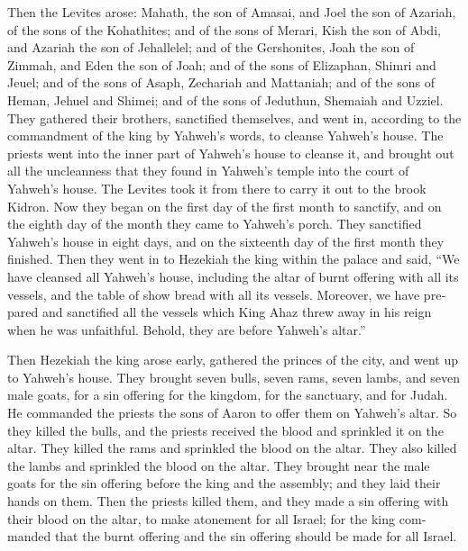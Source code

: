 \begin{paracol}{2}
\begin{otherlanguage}{english}
 Then the Levites arose: Mahath, the son of Amasai, and
Joel the son of Azariah, of the sons of the Kohathites; and of the sons
of Merari, Kish the son of Abdi, and Azariah the son of Jehallelel; and
of the Gershonites, Joah the son of Zimmah, and Eden the son of Joah;
 and of the sons of Elizaphan, Shimri and Jeuel; and of
the sons of Asaph, Zechariah and Mattaniah;  and of the
sons of Heman, Jehuel and Shimei; and of the sons of Jeduthun, Shemaiah
and Uzziel.  They gathered their brothers, sanctified
themselves, and went in, according to the commandment of the king by
Yahweh's words, to cleanse Yahweh's house.  The priests
went into the inner part of Yahweh's house to cleanse it, and brought
out all the uncleanness that they found in Yahweh's temple into the
court of Yahweh's house. The Levites took it from there to carry it out
to the brook Kidron.  Now they began on the first day of
the first month to sanctify, and on the eighth day of the month they
came to Yahweh's porch. They sanctified Yahweh's house in eight days,
and on the sixteenth day of the first month they finished.
 Then they went in to Hezekiah the king within the palace
and said, ``We have cleansed all Yahweh's house, including the altar of
burnt offering with all its vessels, and the table of show bread with
all its vessels.  Moreover, we have prepared and
sanctified all the vessels which King Ahaz threw away in his reign when
he was unfaithful. Behold, they are before Yahweh's altar.''

 Then Hezekiah the king arose early, gathered the princes
of the city, and went up to Yahweh's house.  They brought
seven bulls, seven rams, seven lambs, and seven male goats, for a sin
offering for the kingdom, for the sanctuary, and for Judah. He commanded
the priests the sons of Aaron to offer them on Yahweh's altar.
 So they killed the bulls, and the priests received the
blood and sprinkled it on the altar. They killed the rams and sprinkled
the blood on the altar. They also killed the lambs and sprinkled the
blood on the altar.  They brought near the male goats for
the sin offering before the king and the assembly; and they laid their
hands on them.  Then the priests killed them, and they
made a sin offering with their blood on the altar, to make atonement for
all Israel; for the king commanded that the burnt offering and the sin
offering should be made for all Israel.


\end{otherlanguage}
\end{paracol}
